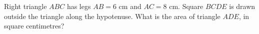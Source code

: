 Right triangle $ABC$ has legs $AB=6$ cm and $AC=8$ cm. Square $BCDE$ is drawn outside the triangle along the hypotenuse. What is the area of triangle $ADE$, in square centimetres?
